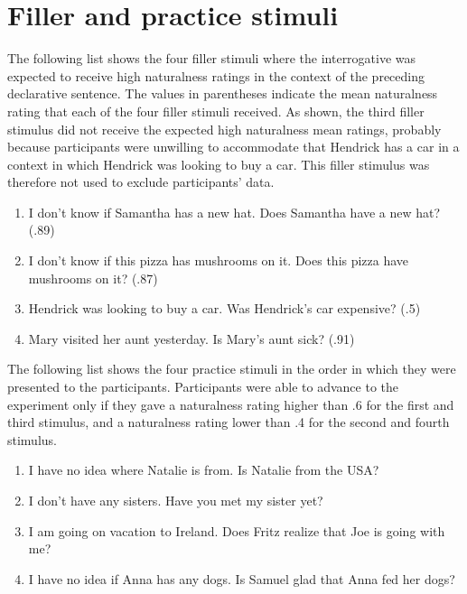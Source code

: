 \documentclass[11pt,fleqn]{article}
\newcommand{\6}{\mbox{$[\hspace*{-.6mm}[$}}
\newcommand{\9}{\mbox{$]\hspace*{-.6mm}]$}}
\begin{document}
\section{Filler and practice stimuli}\label{a:fillerPractice}

The following list shows the four filler stimuli where the interrogative was expected to receive high naturalness ratings in the context of the preceding declarative sentence. The values in parentheses indicate the mean naturalness rating that each of the four filler stimuli received. As shown, the third filler stimulus did not receive the expected high naturalness mean ratings, probably because participants were unwilling to accommodate that Hendrick has a car in a context in which Hendrick was looking to buy a car. This filler stimulus was therefore not used to exclude participants' data. 

\begin{enumerate}[leftmargin=4ex,itemsep=-2pt]

\item I don't know if Samantha has a new hat. Does Samantha have a new hat? (.89)

\item  I don't know if this pizza has mushrooms on it. Does this pizza have mushrooms on it? (.87)

\item Hendrick was looking to buy a car. Was Hendrick's car expensive? (.5)

\item Mary visited her aunt yesterday. Is Mary's aunt sick? (.91)

\end{enumerate}

\noindent
The following list shows the four practice stimuli in the order in which they were presented to the participants. Participants were able to advance to the experiment only if they gave a naturalness rating higher than .6 for the first and third stimulus, and a naturalness rating lower than .4 for the second and fourth stimulus.

\begin{enumerate}[leftmargin=4ex,itemsep=-2pt]

\item I have no idea where Natalie is from. Is Natalie from the USA?

\item I don't have any sisters. Have you met my sister yet?

\item I am going on vacation to Ireland. Does Fritz realize that Joe is going with me?

\item I have no idea if Anna has any dogs. Is Samuel glad that Anna fed her dogs?

\end{enumerate}



 
\end{document}
